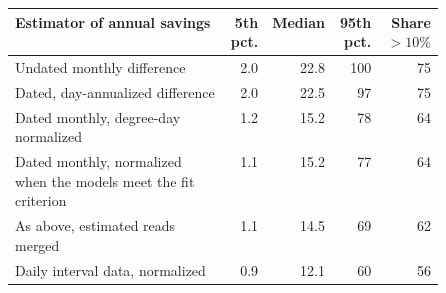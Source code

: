 \begin{tabular}{p{0.5\linewidth}rrrr}
\hline
Estimator of annual savings & 5th pct. & Median & 95th pct. & Share $>10\%$ \\
\hline
Undated monthly difference & 2.0 & 22.8 & 100 & 75 \\
Dated, day-annualized difference & 2.0 & 22.5 & 97 & 75 \\
Dated monthly, degree-day normalized & 1.2 & 15.2 & 78 & 64 \\
Dated monthly, normalized when the models meet the fit criterion & 1.1 & 15.2 & 77 & 64 \\
As above, estimated reads merged & 1.1 & 14.5 & 69 & 62 \\
Daily interval data, normalized & 0.9 & 12.1 & 60 & 56 \\
\hline
\end{tabular}

